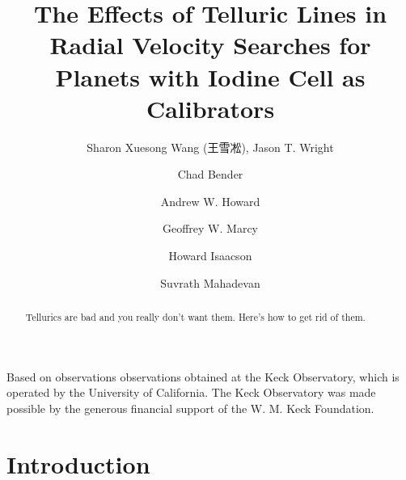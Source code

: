 \documentclass{emulateapj}
\begin{document}

\begin{CJK*}{UTF8}{gbsn}

\title
{
The Effects of Telluric Lines in Radial Velocity Searches for Planets with Iodine
Cell as Calibrators
}

{
Based on observations observations obtained at the Keck Observatory, which is operated
by the University of California.  The Keck Observatory was made
possible by the generous financial support of the W. M. Keck
Foundation.
}

\author{Sharon Xuesong Wang (王雪凇),
  Jason T. Wright} %
\author{Chad Bender} %
\author{Andrew W. Howard} %
\author{Geoffrey W. Marcy} %
\author{Howard Isaacson} %
\author{Suvrath Mahadevan} %








\begin{abstract}

Tellurics are bad and you really don't want them. Here's how to get
rid of them.

\end{abstract}


\section{Introduction}\label{sec:intro}


\end{CJK*}
\end{document}
